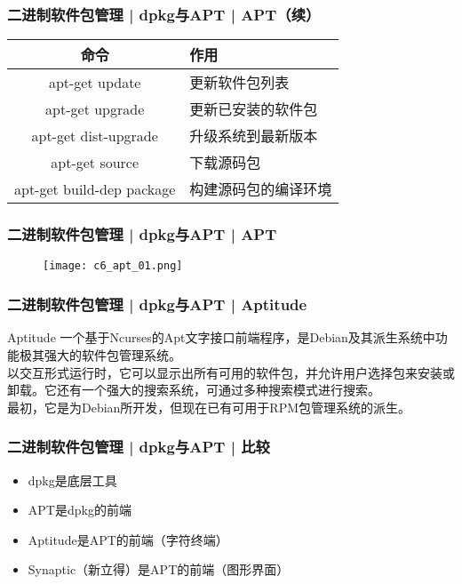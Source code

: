 \begin{frame}[fragile]
  \frametitle{二进制软件包管理 | dpkg与APT | \alert{APT（续）}}
  \begin{table}
    \centering
    \begin{tabularx}{\textwidth}{cX}
      \hline
      \rowcolor{blue!50}命令 & 作用\\
      \hline
      apt-get update & 更新软件包列表\\
      apt-get upgrade & 更新已安装的软件包\\
      apt-get dist-upgrade & 升级系统到最新版本\\
      apt-get source & 下载源码包\\
      apt-get build-dep package & 构建源码包的编译环境\\
      \hline
    \end{tabularx}
  \end{table}
\end{frame}

\begin{frame}
  \frametitle{二进制软件包管理 | dpkg与APT | APT}
  \begin{figure}
    \centering
    \texttt{[image: c6\_apt\_01.png]}
  \end{figure}
\end{frame}

\begin{frame}
  \frametitle{二进制软件包管理 | dpkg与APT | Aptitude}
  \begin{block}{Aptitude}
    一个基于Ncurses的Apt文字接口前端程序，是Debian及其派生系统中功能极其强大的软件包管理系统。\\
     \vspace{5pt}
    以交互形式运行时，它可以显示出所有可用的软件包，并允许用户选择包来安装或卸载。它还有一个强大的搜索系统，可通过多种搜索模式进行搜索。\\
     \vspace{5pt}
    最初，它是为Debian所开发，但现在已有可用于RPM包管理系统的派生。
  \end{block}
\end{frame}

\begin{frame}
  \frametitle{二进制软件包管理 | dpkg与APT | 比较}
  \begin{itemize}
    \item dpkg是底层工具
    \item APT是dpkg的前端
    \item Aptitude是APT的前端（字符终端）
    \item Synaptic（新立得）是APT的前端（图形界面）
  \end{itemize}
\end{frame}

